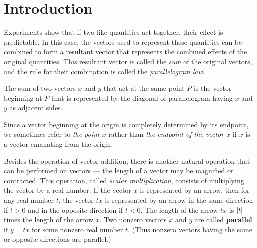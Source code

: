 \section{Introduction}\label{sec:1.1}

\begin{note}
  Experiments show that if two like quantities act together, their effect is predictable.
  In this case, the vectors used to represent these quantities can be combined to form a resultant vector that represents the combined effects of the original quantities.
  This resultant vector is called the \emph{sum} of the original vectors, and the rule for their combination is called the \emph{parallelogram law}.
\end{note}

\begin{ax}\label{1.1.1}
  The sum of two vectors \(x\) and \(y\) that act at the same point \(P\) is the vector beginning at \(P\) that is represented by the diagonal of parallelogram having \(x\) and \(y\) as adjacent sides.
\end{ax}

\begin{note}
  Since a vector beginning at the origin is completely determined by its endpoint, we sometimes refer to \emph{the point \(x\)} rather than \emph{the endpoint of the vector \(x\)} if \(x\) is a vector emanating from the origin.
\end{note}

\begin{note}
  Besides the operation of vector addition, there is another natural operation that can be performed on vectors
  --- the length of a vector may be magnified or contracted.
  This operation, called \emph{scalar multiplication}, consists of multiplying the vector by a real number.
  If the vector \(x\) is represented by an arrow, then for any real number \(t\), the vector \(tx\) is represented by an arrow in the same direction if \(t > 0\) and in the opposite direction if \(t < 0\).
  The length of the arrow \(tx\) is \(\left\lvert t\right\rvert\) times the length of the arrow \(x\).
  Two nonzero vectors \(x\) and \(y\) are called \textbf{parallel} if \(y = tx\) for some nonzero real number \(t\).
  (Thus nonzero vectors having the same or opposite directions are parallel.)
\end{note}

